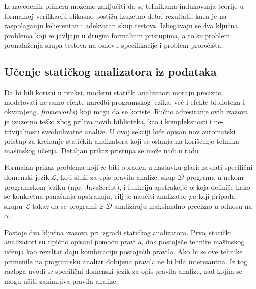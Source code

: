 \documentclass[a4paper]{article}
\theoremstyle{definition}
\begin{document}
{\par Iz navedenih primera možemo zaključiti da se tehnikama indukovanja teorije u formalnoj verifikaciji efikasno postižu izuzetno dobri rezultati, kada je na raspolaganju koherentan i adekvatan skup testova. Izbegavaju se dva ključna problema koji se javljaju u drugim formalnim pristupima, a to su problem pronalaženja skupa testova na osnovu specifikacije i problem proročišta.

\subsection{Učenje statičkog analizatora iz podataka}
\label{sec:staticki-analizator}

Da bi bili korisni u praksi, moderni statički analizatori moraju precizno 
modelovati ne samo efekte naredbi programskog jezika, već i efekte biblioteka 
i okvira(eng. \emph{frameworks}) koji mogu da se koriste. Ručno adresiranje ovih izazova 
je izuzetno teško zbog priliva novih biblioteka, kao i kompleksnosti i 
ne-trivijalnosti sveobuhvatne analize. U ovoj sekciji biće opisan nov 
automatski pristup za kreiranje statičkih analizatora koji se oslanja na 
korišćenje tehnika mašinskog učenja. Detaljan prikaz pristupa se može naći 
u radu \cite{staticAnalyzer}.

Formalan prikaz problema koji će biti obrađen u nastavku glasi: za dati 
specifični domenski jezik $\mathcal{L}$, koji služi za opis pravila analize, 
skup $\mathcal{D}$ programa u nekom programskom jeziku (npr. JavaScript), i 
funkciju apstrakcije $\alpha$ koja definiše kako se konkretna ponašanja 
apstrahuju, cilj je naučiti analizator $pa$ koji pripada skupu $\mathcal{L}$ 
takav da se programi iz $\mathcal{D}$ analiziraju maksimalno precizno u odnosu 
na $\alpha$.


Postoje dva ključna izazova pri izgradi statičkog analizatora. Prvo, statički 
analizatori su tipično opisani pomoću pravila, dok postojeće tehnike mašinskog 
učenja kao rezultat daju kombinaciju postojećih pravila. Ako bi se ove tehnike 
primenile na programsku analizu \cite{predictingProgramProperties} dobijena 
pravila ne bi bila interesantna. Iz tog razloga uvodi se specifični domenski 
jezik za opis pravila analize, nad kojim se mogu učiti zanimljiva pravila analize.


}
\end{document}
